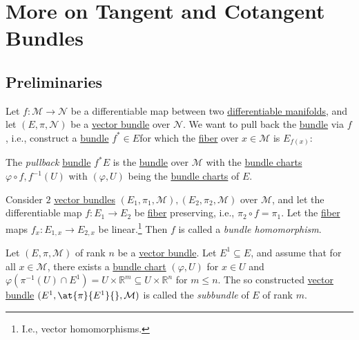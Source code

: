 \section{More on Tangent and Cotangent Bundles}
\subsection{Preliminaries}
Let \(f\colon \mathcal{M} \to \mathcal{N} \) be a differentiable map between two \hyperref[def:smooth-manifold]{differentiable manifolds}, and let \((E, \pi , \mathcal{N} )\)  be a \hyperref[def:vector-bundle]{vector bundle} over \(\mathcal{N} \). We want to pull back the \hyperref[def:vector-bundle]{bundle} via \(f\), i.e., construct a \hyperref[def:vector-bundle]{bundle} \(f^{\ast} \in E\)for which the \hyperref[def:fiber]{fiber} over \(x\in \mathcal{M} \) is \(E_{f(x)}\):

\begin{definition}[Pullback]\label{def:pullback}
	The \emph{pullback} \hyperref[def:vector-bundle]{bundle} \(f^{\ast} E\) is the \hyperref[def:vector-bundle]{bundle} over \(\mathcal{M} \) with the \hyperref[def:bundle-chart]{bundle charts} \(\varphi \circ f, f^{-1} (U)\) with \((\varphi , U)\) being the \hyperref[def:bundle-chart]{bundle charts} of \(E\).
\end{definition}

\begin{definition}\label{def:bundle-homomorphism}
	Consider \(2\) \hyperref[def:vector-bundle]{vector bundles} \((E_1, \pi _1, \mathcal{M} ), (E_2, \pi _2, \mathcal{M} )\) over \(\mathcal{M} \), and let the differentiable map \(f\colon E_1 \to E_2\) be \hyperref[def:fiber]{fiber} preserving, i.e., \(\pi _2 \circ f = \pi _1\). Let the \hyperref[def:fiber]{fiber} maps \(f_x \colon E_{1,x} \to E_{2,x}\) be linear.\footnote{I.e., vector homomorphisms.} Then \(f\) is called a \emph{bundle homomorphism}.
\end{definition}

\begin{definition}[Subbundle]\label{def:subbundle}
	Let \((E, \pi , \mathcal{M} )\) of rank \(n\) be a \hyperref[def:vector-bundle]{vector bundle}. Let \(E^1 \subseteq E\), and assume that for all \(x\in \mathcal{M} \), there exists a \hyperref[def:bundle-chart]{bundle chart} \((\varphi , U)\) for \(x\in U\) and \(\varphi (\pi ^{-1} (U) \cap E^1) = U \times \mathbb{R} ^m \subseteq U \times \mathbb{R} ^n\) for \(m \leq n\). The so constructed \hyperref[def:vector-bundle]{vector bundle} \((E^1, \at{\pi }{E^1}{}, \mathcal{M} )\) is called the \emph{subbundle} of \(E\) of rank \(m\).
\end{definition}

